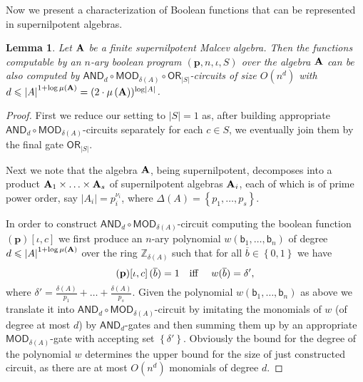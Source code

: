 \documentclass[11pt,a4paper]{amsart}
\newtheorem{lm}{Lemma}[section]
\newcommand{\m}[1]{{\uppercase {\bf{#1}}}}
\newcommand{\set}[1]{{\left\{ {#1} \right\} }}
\newcommand{\card}[1]{\left| #1 \right|}
\renewcommand{\leq}{\leqslant}
\newcommand{\po}[1]{{\mathbf {#1}}}
\newcounter{note}
\renewcommand{\o}[1]{\overline {#1}}
\newcommand{\z}{\mathbb{Z}}
\newcommand{\progg}[4]{\left(#1,#2,#3,#4\right)}
\newcommand{\progb}[3]{\left(#1\right)\!\left[#2,#3\right]}
\renewcommand{\b}{\textsf{b}}
\newcommand{\true}{1}
\newcommand{\false}{0}
\newcommand{\bool}{\set{\false,\true}}
\newcommand{\ccc}{c}    \newcommand{\s}{s}
\newcommand{\ccand}{\mathsf{AND}}
\newcommand{\ccmod}{\mathsf{MOD}}
\newcommand{\ccor}{\mathsf{OR}}
\newcommand{\sdiv}[1]{\Delta\left(#1\right)}    \newcommand{\ppdiv}{\delta}
\newcommand{\pdiv}[1]{\ppdiv\left(#1\right)}    \newcommand{\ar}[1]{\mu\left({#1}\right)}       \newcommand{\maxar}[1]{\mu\left({\m #1}\right)}
\begin{document}
Now we present a characterization of Boolean functions that can be represented in supernilpotent algebras. 


\begin{lm}
\label{lm:supernil-circuit}
Let $\m A$ be a finite supernilpotent Malcev algebra.
Then the functions computable by an $n$-ary boolean program
$\progg{\po p}{n}{\iota}{S}$ over the algebra $\m A$
can be also computed by
$\ccand_d\circ\ccmod_{\pdiv A}\circ\ccor_{\card S}$-circuits of size $O(n^d)$ with
$d\leq\card{A}^{1+\log\maxar A} = (2 \cdot \maxar A)^{\log\card{A}}$.
\end{lm}



\begin{proof}
First we reduce our setting to $\card S =1$ as, after building appropriate $\ccand_d\circ\ccmod_{\pdiv A}$-circuits separately for each $\ccc \in S$,
we eventually join them by the final gate $\ccor_{\card S}$.

Next we note that the algebra $\m A$, being supernilpotent,
decomposes into a product $\m A_1 \times\ldots\times \m A_\s$ of supernilpotent algebras $\m A_i$,
each of which is of prime power order, say $\card{A_i}=p_i^{\nu_i}$,
where $\sdiv A=\set{p_1,\ldots,p_\s}$.

In order to construct $\ccand_d\circ\ccmod_{\pdiv A}$-circuit computing the boolean function
$\progb{\po p}{\iota}{\ccc}$ we first produce an $n$-ary polynomial $w(\b_1,\ldots,\b_n)$
of degree $d\leq\card{A}^{1+\log\maxar A}$ over the ring $\z_{\pdiv A}$
such that for all $\o b\in \bool$ we have
\[
\progb{\po p}{\iota}{\ccc}(\o b)=\true \mbox{\quad iff \quad}
w(\o b)=\ppdiv',
\]
where $\ppdiv'=\frac{\pdiv A}{p_1}+\ldots+\frac{\pdiv A}{p_\s}$.
Given the polynomial $w(\b_1,\ldots,\b_n)$ as above
we translate it into $\ccand_d\circ\ccmod_{\pdiv A}$-circuit
by imitating the monomials of $w$ (of degree at most $d$) by $\ccand_d$-gates
and then summing them up by an appropriate
$\ccmod_{\pdiv A}$-gate with accepting set $\set{\ppdiv'}$.
Obviously the bound for the degree of the polynomial $w$ determines the upper bound for the size of just constructed circuit, as there are at most $O(n^d)$ monomials of degree $d$.


\end{proof}
\end{document}
